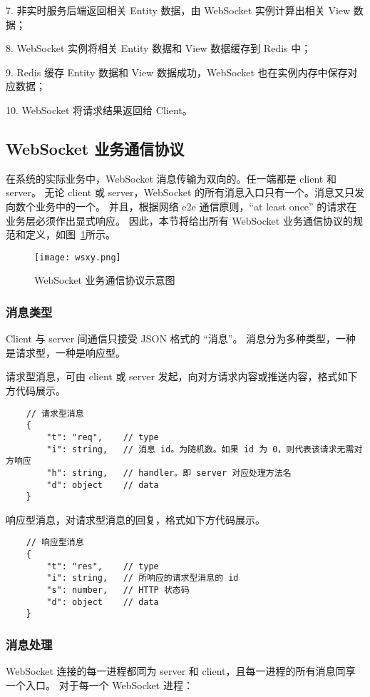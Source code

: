 7. 非实时服务后端返回相关 Entity 数据，由 WebSocket 实例计算出相关 View 数据；

8. WebSocket 实例将相关 Entity 数据和 View 数据缓存到 Redis 中；

9. Redis 缓存 Entity 数据和 View 数据成功，WebSocket 也在实例内存中保存对应数据；

10. WebSocket 将请求结果返回给 Client。

  \subsection{WebSocket 业务通信协议}
  在系统的实际业务中，WebSocket 消息传输为双向的。任一端都是 client 和 server。
无论 client 或 server，WebSocket 的所有消息入口只有一个。消息又只发向数个业务中的一个。
并且，根据网络 e2e 通信原则，“at least once” 的请求在业务层必须作出显式响应。
因此，本节将给出所有 WebSocket 业务通信协议的规范和定义，如图~\ref{fig:wsxy}所示。

\begin{figure}[!htp]
    \centering
    \texttt{[image: wsxy.png]}
    \caption{WebSocket 业务通信协议示意图}
    \label{fig:wsxy}
  \end{figure}

  \subsubsection{消息类型}
  Client 与 server 间通信只接受 JSON 格式的 “消息”。
  消息分为多种类型，一种是请求型，一种是响应型。

  请求型消息，可由 client 或 server 发起，向对方请求内容或推送内容，格式如下方代码展示。
  {\setmainfont{Courier New Bold}
\begin{lstlisting}
    // 请求型消息
    {
        "t": "req",    // type
        "i": string,   // 消息 id。为随机数。如果 id 为 0，则代表该请求无需对方响应
        "h": string,   // handler。即 server 对应处理方法名
        "d": object    // data
    }
 \end{lstlisting}}

 响应型消息，对请求型消息的回复，格式如下方代码展示。
 {\setmainfont{Courier New Bold}
 \begin{lstlisting}
    // 响应型消息
    {
        "t": "res",    // type
        "i": string,   // 所响应的请求型消息的 id
        "s": number,   // HTTP 状态码
        "d": object    // data
    }
  \end{lstlisting}}

  \subsubsection{消息处理}
  WebSocket 连接的每一进程都同为 server 和 client，且每一进程的所有消息同享一个入口。
对于每一个 WebSocket 进程：

